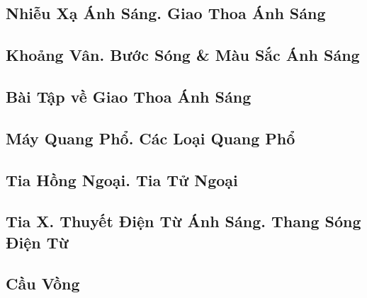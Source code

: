 \documentclass{article}
\numberwithin{equation}{section}
\begin{document}

\subsection{Nhiễu Xạ Ánh Sáng. Giao Thoa Ánh Sáng}


\subsection{Khoảng Vân. Bước Sóng \& Màu Sắc Ánh Sáng}


\subsection{Bài Tập về Giao Thoa Ánh Sáng}


\subsection{Máy Quang Phổ. Các Loại Quang Phổ}


\subsection{Tia Hồng Ngoại. Tia Tử Ngoại}


\subsection{Tia X. Thuyết Điện Từ Ánh Sáng. Thang Sóng Điện Từ}


\subsection{Cầu Vồng}

\end{document}

